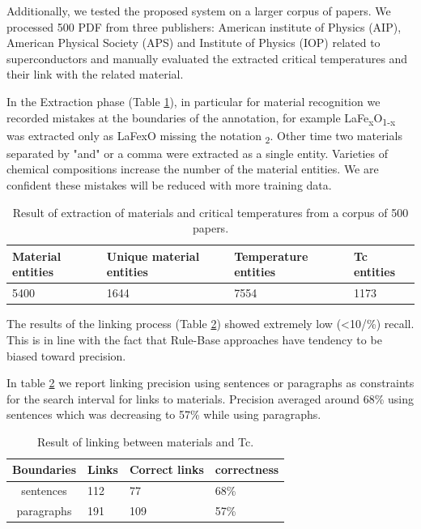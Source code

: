 \documentclass{article}[a4]
\begin{document}
Additionally, we tested the proposed system on a larger corpus of papers. We processed 500 PDF from three publishers: American institute of Physics (AIP), American Physical Society (APS) and Institute of Physics (IOP) related to superconductors and manually evaluated the extracted critical temperatures and their link with the related material. 

In the Extraction phase (Table \ref{table:result-extraction}), in particular for material recognition we recorded mistakes at the boundaries of the annotation, for example LaFe\textsubscript{x}O\textsubscript{1-x} was extracted only as LaFexO missing the notation \textsubscript{2}. Other time two materials separated by "and" or a comma were extracted as a single entity. Varieties of chemical compositions increase the number of the material entities.
We are confident these mistakes will be reduced with more training data.  

\begin{table}[h!]
    \centering
    \begin{tabular}{ | m{4em} | m{4em} | m{6em} | m{5em} | } 
    \hline
        Material entities & Unique material entities & Temperature entities & Tc entities \\
    \hline
        5400 & 1644 & 7554 & 1173 \\ 
    \hline
    \end{tabular}
    \label{table:result-extraction}
    \caption{Result of extraction of materials and critical temperatures from a corpus of 500 papers.}    
\end{table}

The results of the linking process (Table  \ref{table:result-linking}) showed extremely low (\textless 10/\%) recall. This is in line with the fact that Rule-Base approaches have tendency to be biased toward precision. 

In table \ref{table:result-linking} we report linking precision using sentences or paragraphs as constraints for the search interval for links to materials. Precision averaged around 68\% using sentences which was decreasing to 57\% while using paragraphs. 

\begin{table}[h!]
    \centering
    \begin{tabular}{ | c | m{5em}| m{5em}| m{5em}| } 
    \hline
        Boundaries & Links & Correct links & correctness  \\
    \hline
            sentences  & 112 & 77 & 68\% \\
    \hline
            paragraphs & 191 & 109 & 57\% \\
    \hline
    \end{tabular}
    \label{table:result-linking}
    \caption{Result of linking between materials and Tc.}    
\end{table}
\end{document}
